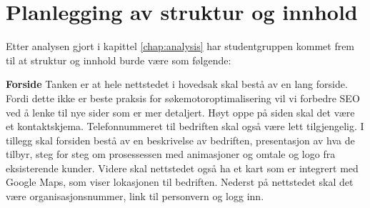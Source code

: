 









\section{Planlegging av struktur og innhold}

Etter analysen gjort i kapittel \ref{chap:analysis} har studentgruppen kommet frem til at struktur og innhold burde være som følgende: 

\textbf{Forside} Tanken er at hele nettstedet i hovedsak skal bestå av en lang forside. Fordi dette ikke er beste praksis for søkemotoroptimalisering vil vi forbedre SEO ved å lenke til nye sider som er mer detaljert. Høyt oppe på siden skal det være et kontaktskjema. Telefonnummeret til bedriften skal også være lett tilgjengelig. I tillegg skal forsiden bestå av en beskrivelse av bedriften, presentasjon av hva de tilbyr, steg for steg om prosessessen med animasjoner og omtale og logo fra eksisterende kunder. Videre skal nettstedet også ha et kart som er integrert med Google Maps, som viser lokasjonen til bedriften. Nederst på nettstedet skal det være organisasjonsnummer, link til personvern og logg inn.

